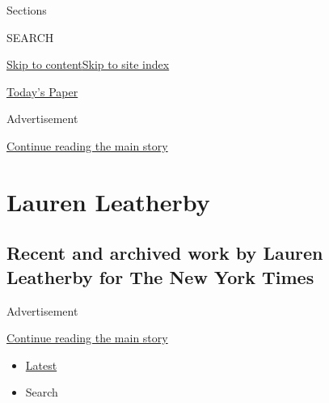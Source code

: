 Sections

SEARCH

\protect\hyperlink{site-content}{Skip to
content}\protect\hyperlink{site-index}{Skip to site index}

\href{https://myaccount.nytimes3xbfgragh.onion/auth/login?response_type=cookie\&client_id=vi}{}

\href{https://www.nytimes3xbfgragh.onion/section/todayspaper}{Today's
Paper}

Advertisement

\protect\hyperlink{after-top}{Continue reading the main story}

\hypertarget{lauren-leatherby}{%
\section{Lauren Leatherby}\label{lauren-leatherby}}

\hypertarget{recent-and-archived-work-by-lauren-leatherby-for-the-new-york-times}{%
\subsection{Recent and archived work by Lauren Leatherby for The New
York
Times}\label{recent-and-archived-work-by-lauren-leatherby-for-the-new-york-times}}

Advertisement

\protect\hyperlink{after-mid1}{Continue reading the main story}

\begin{itemize}
\tightlist
\item
  \protect\hyperlink{stream-panel}{Latest}
\item
  Search
\end{itemize}

